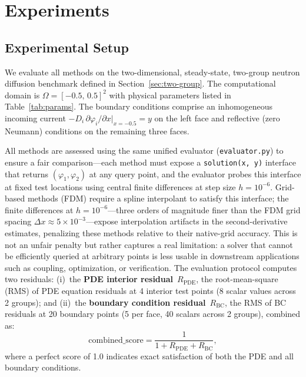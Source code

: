\section{Experiments}
\label{sec:experiments}

\subsection{Experimental Setup}
\label{sec:setup}

We evaluate all methods on the two-dimensional, steady-state, two-group neutron diffusion benchmark defined in Section~\ref{sec:two-group}. The computational domain is $\Omega = [-0.5,\, 0.5]^2$ with physical parameters listed in Table~\ref{tab:params}. The boundary conditions comprise an inhomogeneous incoming current $-D_i\,\partial\varphi_i/\partial x\big|_{x=-0.5} = y$ on the left face and reflective (zero Neumann) conditions on the remaining three faces.

All methods are assessed using the same unified evaluator (\texttt{evaluator.py}) to ensure a fair comparison---each method must expose a \texttt{solution(x, y)} interface that returns $(\varphi_1, \varphi_2)$ at any query point, and the evaluator probes this interface at fixed test locations using central finite differences at step size $h = 10^{-6}$. Grid-based methods (FDM) require a spline interpolant to satisfy this interface; the finite differences at $h = 10^{-6}$---three orders of magnitude finer than the FDM grid spacing $\Delta x \approx 5\times10^{-3}$---expose interpolation artifacts in the second-derivative estimates, penalizing these methods relative to their native-grid accuracy. This is not an unfair penalty but rather captures a real limitation: a solver that cannot be efficiently queried at arbitrary points is less usable in downstream applications such as coupling, optimization, or verification. The evaluation protocol computes two residuals: (i)~the \textbf{PDE interior residual}~$R_{\text{PDE}}$, the root-mean-square (RMS) of PDE equation residuals at 4 interior test points (8 scalar values across 2 groups); and (ii)~the \textbf{boundary condition residual}~$R_{\text{BC}}$, the RMS of BC residuals at 20 boundary points (5 per face, 40 scalars across 2 groups), combined as:
\begin{equation}
  \text{combined\_score} = \frac{1}{1 + R_{\text{PDE}} + R_{\text{BC}}},
  \label{eq:combined-score-exp}
\end{equation}
where a perfect score of 1.0 indicates exact satisfaction of both the PDE and all boundary conditions.

